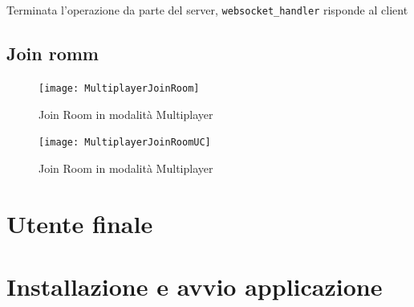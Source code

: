 \documentclass[paper=a4, fontsize=11pt]{scrartcl} %
\numberwithin{equation}{section} %
\numberwithin{figure}{section} %
\numberwithin{table}{section} %
\begin{document}
Terminata l'operazione da parte del server, \texttt{websocket\_handler} risponde al client



\subsection{Join romm}

\begin{figure}
\centering
\texttt{[image: MultiplayerJoinRoom]}
\caption{Join Room in modalità Multiplayer}
\label{JoinRoom}
\end{figure}

\begin{figure}
\centering
\texttt{[image: MultiplayerJoinRoomUC]}
\caption{Join Room in modalità Multiplayer}
\label{JoinRoomUC}
\end{figure}

\section{Utente finale}
\newpage
\section{Installazione  e avvio applicazione}



\end{document}

